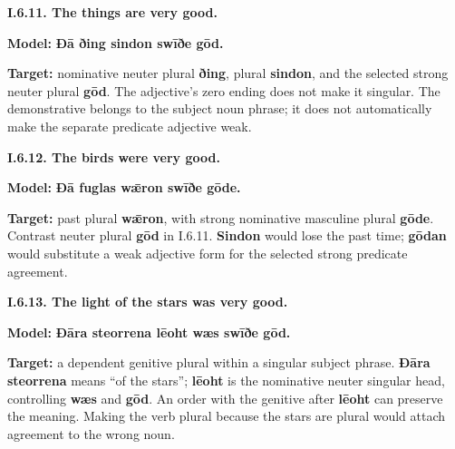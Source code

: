 \par\begin{minipage}{\linewidth}\raggedright
\textbf{I.6.11. The things are very good.}

\textbf{Model:} \textbf{Ðā ðing sindon swīðe gōd.}

\textbf{Target:} nominative neuter plural \textbf{ðing}, plural \textbf{sindon}, and the selected strong neuter plural \textbf{gōd}. The adjective’s zero ending does not make it singular. The demonstrative belongs to the subject noun phrase; it does not automatically make the separate predicate adjective weak.

\end{minipage}\par\addvspace{4pt}

\par\begin{minipage}{\linewidth}\raggedright
\textbf{I.6.12. The birds were very good.}

\textbf{Model:} \textbf{Ðā fuglas wǣron swīðe gōde.}

\textbf{Target:} past plural \textbf{wǣron}, with strong nominative masculine plural \textbf{gōde}. Contrast neuter plural \textbf{gōd} in I.6.11. \textbf{Sindon} would lose the past time; \textbf{gōdan} would substitute a weak adjective form for the selected strong predicate agreement.

\end{minipage}\par\addvspace{4pt}

\par\begin{minipage}{\linewidth}\raggedright
\textbf{I.6.13. The light of the stars was very good.}

\textbf{Model:} \textbf{Ðāra steorrena lēoht wæs swīðe gōd.}

\textbf{Target:} a dependent genitive plural within a singular subject phrase. \textbf{Ðāra steorrena} means “of the stars”; \textbf{lēoht} is the nominative neuter singular head, controlling \textbf{wæs} and \textbf{gōd}. An order with the genitive after \textbf{lēoht} can preserve the meaning. Making the verb plural because the stars are plural would attach agreement to the wrong noun.

\end{minipage}\par\addvspace{4pt}

